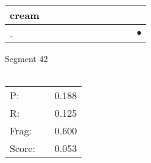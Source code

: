 \documentclass[landscape]{article}
\newcommand{\ssp}{\hspace{2pt}}
\newcommand{\mex}{\cellcolor{g}$\bullet$}
\begin{document}
\begin{tabular}{|l|p{10pt}|p{10pt}|p{10pt}|p{10pt}|p{10pt}|p{10pt}|p{10pt}|p{10pt}|p{10pt}|p{10pt}|}
\hline
\ssp cream \ssp&\hspace{2pt}&\hspace{2pt}&\hspace{2pt}&\hspace{2pt}&\hspace{2pt}&\hspace{2pt}&\hspace{2pt}&\hspace{2pt}&\hspace{2pt}&\hspace{2pt}\\
\hline
\ssp \cellcolor{ref9}. \ssp&\hspace{2pt}&\hspace{2pt}&\hspace{2pt}&\hspace{2pt}&\hspace{2pt}&\hspace{2pt}&\hspace{2pt}&\hspace{2pt}&\hspace{2pt}&\hspace{2pt}\mex\\
\hline
\end{tabular}

\vspace{6pt}
\noindent Segment 42\\\\
\noindent\begin{tabular}{lm{12pt}r}
\hline
P:&&0.188\\
R:&&0.125\\
Frag:&&0.600\\
Score:&&0.053\\
\end{tabular}

\newpage
\end{document}
